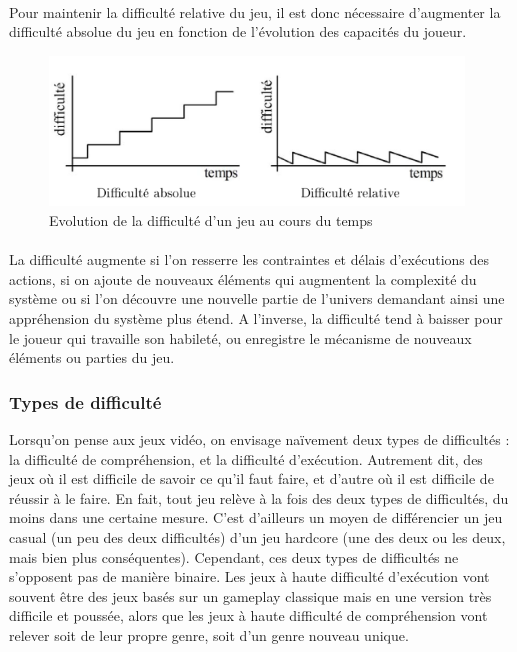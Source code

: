 \paragraph{}Pour maintenir la difficulté relative du jeu, il est donc nécessaire d’augmenter la difficulté absolue du jeu en fonction de l’évolution des capacités du joueur.

\begin{figure}[!hb]
	\centering
	\includegraphics[width=11cm]{images/evolution_difficulte.png}
	\caption{Evolution de la difficulté d'un jeu au cours du temps}
	\label{evolution_difficulte}
\end{figure}

\paragraph{}La difficulté augmente si l’on resserre les contraintes et délais d’exécutions des actions, si on ajoute de nouveaux éléments qui augmentent la complexité du système ou si l’on découvre une nouvelle partie de l’univers demandant ainsi une appréhension du système plus étend. A l’inverse, la difficulté tend à baisser pour le joueur qui travaille son habileté, ou enregistre le mécanisme de nouveaux éléments ou parties du jeu.

		\subsubsection{Types de difficulté}
Lorsqu'on pense aux jeux vidéo, on envisage naïvement deux types de difficultés : la difficulté de compréhension, et la difficulté d’exécution. Autrement dit, des jeux où il est difficile de savoir ce qu’il faut faire, et d’autre où il est difficile de réussir à le faire. En fait, tout jeu relève à la fois des deux types de difficultés, du moins dans une certaine mesure. C’est d’ailleurs un moyen de différencier un jeu casual (un peu des deux difficultés) d’un jeu hardcore (une des deux ou les deux, mais bien plus conséquentes). Cependant, ces deux types de difficultés ne s’opposent pas de manière binaire. Les jeux à haute difficulté d’exécution vont souvent être des jeux basés sur un gameplay classique mais en une version très difficile et poussée, alors que les jeux à haute difficulté de compréhension vont relever soit de leur propre genre, soit d’un genre nouveau unique. \\

